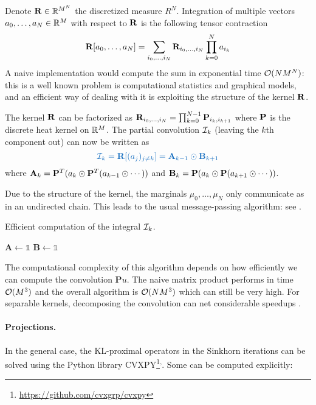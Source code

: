 \documentclass[../report.tex]{subfiles}
\begin{document}
Denote $\mathbf{R} \in \mathbb{R}^{M^N}$ the discretized measure $R^N$. Integration of multiple vectors $a_0,\ldots,a_N\in\mathbb{R}^M$ with respect to $\mathbf{R}$ is the following tensor contraction
\[
	\mathbf{R}[a_0, \ldots, a_N] =
	\sum_{i_0,\ldots,i_N} \mathbf{R}_{i_0,\ldots,i_N}\prod_{k=0}^N a_{i_k}
\]
A naive implementation would compute the sum in exponential time $\mathcal{O}(NM^N)$: this is a well known problem is computational statistics and graphical models, and an efficient way of dealing with it is exploiting the structure of the kernel $\mathbf{R}$.

\begin{prop}\label{prop:efficientConvol}
The kernel $\mathbf{R}$ can be factorized as $\mathbf{R}_{i_0,\ldots,i_N} = \prod_{k=0}^{N-1} \mathbf{P}_{i_k,i_{k+1}}$ where $\mathbf{P}$ is the discrete heat kernel on $\mathbb{R}^M$. The partial convolution $\mathcal{I}_k$ (leaving the $k$th component out) can now be written as
\begin{equation}
{\bluefont
	\calI_k = \bfR[(a_j)_{j\neq k}] =
	\mathbf{A}_{k-1} \odot \mathbf{B}_{k+1}
}
\end{equation}
where $\mathbf{A}_{k} = \mathbf{P}^T (a_k \odot \mathbf{P}^T(a_{k-1} \odot \cdots))$ and $\mathbf{B}_k = \mathbf{P} (a_k \odot \mathbf{P} (a_{k+1}\odot \cdots))$.
\end{prop}

Due to the structure of the kernel, the marginals $\mu_0,\ldots,\mu_N$ only communicate as in an undirected chain. This leads to the usual message-passing algorithm: see .
\begin{algorithm}[h]
\caption{Efficient computation of the integral $\mathcal{I}_k$.}\label{algo:EfficientIntegral}
$\mathbf{A} \leftarrow \mathds{1}$\;
$\mathbf{B} \leftarrow \mathds{1}$\;
\;
\end{algorithm}

The computational complexity of this algorithm depends on how efficiently we can compute the convolution $\mathbf{P}u$. The naive matrix product performs in time $\mathcal{O}(M^3)$ and the overall algorithm is $\mathcal{O}(NM^3)$ which can still be very high. For separable kernels, decomposing the convolution can net considerable speedups \parencite[p.~74]{peyr2018computational}.

\paragraph{Projections.}
In the general case, the KL-proximal operators in the Sinkhorn iterations can be solved using the Python library CVXPY\footnote{\url{https://github.com/cvxgrp/cvxpy}}\textsuperscript{,}. Some can be computed explicitly:
\end{document}
